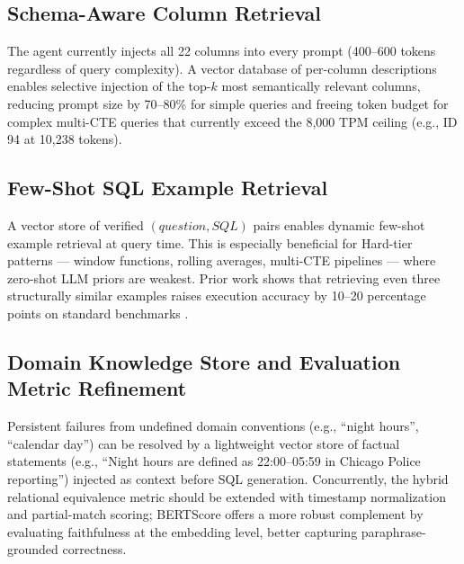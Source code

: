 \documentclass{article}
\begin{document}
\subsection{Schema-Aware Column Retrieval}

The agent currently injects all 22 columns into every prompt (400--600 tokens regardless of query complexity). A vector database of per-column descriptions enables selective injection of the top-$k$ most semantically relevant columns, reducing prompt size by 70--80\% for simple queries and freeing token budget for complex multi-CTE queries that currently exceed the 8,000 TPM ceiling (e.g., ID\,94 at 10,238 tokens).

\subsection{Few-Shot SQL Example Retrieval}

A vector store of verified $(question, SQL)$ pairs enables dynamic few-shot example retrieval at query time. This is especially beneficial for Hard-tier patterns --- window functions, rolling averages, multi-CTE pipelines --- where zero-shot LLM priors are weakest. Prior work shows that retrieving even three structurally similar examples raises execution accuracy by 10--20 percentage points on standard benchmarks \cite{guo2023prompting}.

\subsection{Domain Knowledge Store and Evaluation Metric Refinement}

Persistent failures from undefined domain conventions (e.g., ``night hours'', ``calendar day'') can be resolved by a lightweight vector store of factual statements (e.g., ``Night hours are defined as 22:00--05:59 in Chicago Police reporting'') injected as context before SQL generation. Concurrently, the hybrid relational equivalence metric should be extended with timestamp normalization and partial-match scoring; BERTScore \cite{zhang2020bertscore} offers a more robust complement by evaluating faithfulness at the embedding level, better capturing paraphrase-grounded correctness.



\end{document}
